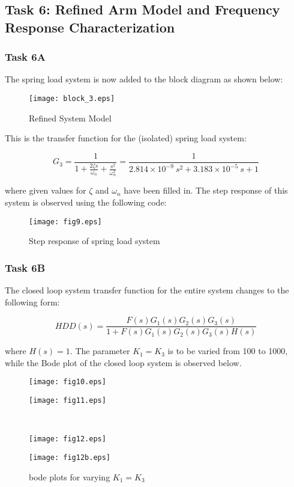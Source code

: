\documentclass{article}
\newcommand{\matlab}[1]{%
%
}
\begin{document}
\subsection*{Task 6: Refined Arm Model and Frequency Response Characterization}

\subsubsection*{Task 6A}

The spring load system is now added to the block diagram as shown below:

\begin{figure}[H]
  \centering
  \caption{Refined System Model}
  \texttt{[image: block\_3.eps]}
\end{figure}

This is the transfer function for the (isolated) spring load system:

$$G_3 = \frac{1}{1 + \frac{2\zeta s}{\omega_n} + \frac{s^2}{\omega_n^2}}
      = \frac{1}{2.814\times 10^{-9} ~ s^2 + 3.183\times 10^{-5} ~ s + 1}$$

\noindent
where given values for $\zeta$ and $\omega_n$ have been filled in.
The step response of this system is observed using the following code:

\matlab{fig9.m}

\begin{figure}[H]
  \caption{Step response of spring load system}
  \centering
  \texttt{[image: fig9.eps]}
\end{figure}

\subsubsection*{Task 6B}

The closed loop system transfer function for the entire system changes
to the following form:

$$HDD(s) = \frac{F(s)G_1(s)G_2(s)G_3(s)}{1 + F(s)G_1(s)G_2(s)G_3(s)H(s)}$$

\noindent
where $H(s) = 1$.  The parameter $K_1 = K_3$ is to be varied from 100
to 1000, while the Bode plot of the closed loop system is observed
below.

\matlab{fig10.m}

\begin{figure}[H]\centering
  \caption{bode plots for varying $K_1 = K_3$}
  \begin{minipage}{9cm}
    \texttt{[image: fig10.eps]}
  \end{minipage}%
  \begin{minipage}{9cm}
    \texttt{[image: fig11.eps]}
  \end{minipage}\\
  \begin{minipage}{9cm}
    \texttt{[image: fig12.eps]}
  \end{minipage}%
  \begin{minipage}{9cm}
    \texttt{[image: fig12b.eps]}
  \end{minipage}
\end{figure}
\end{document}
